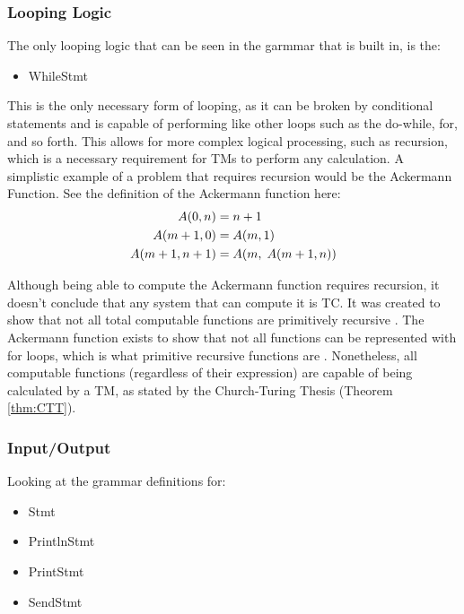 \subsubsection{Looping Logic}\label{subsubsec:LoopLog}

The only looping logic that can be seen in the garmmar that is built in, is the:
\begin{itemize}
    \item WhileStmt
\end{itemize}

This is the only necessary form of looping, as it can be broken by conditional statements and is capable of performing like other loops such as the do-while, for, and so forth.
This allows for more complex logical processing, such as recursion, which is a necessary requirement for TMs to perform any calculation.
A simplistic example of a problem that requires recursion would be the Ackermann Function.
See the definition of the Ackermann function here:
\[
\begin{aligned}
    A(0, n) &= n + 1\\
    A(m + 1, 0) &= A(m,1)\\
    A(m + 1, n + 1) &= A(m,\hspace{0.1cm} A(m + 1,n))
\end{aligned}
\]

Although being able to compute the Ackermann function requires recursion, it doesn't conclude that any system that can compute it is TC.
It was created to show that not all total computable functions are primitively recursive \cite{AckermannPR}.
The Ackermann function exists to show that not all functions can be represented with for loops, which is what primitive recursive functions are \cite{RecursiveFuncs}.
Nonetheless, all computable functions (regardless of their expression) are capable of being calculated by a TM, as stated by the Church-Turing Thesis (Theorem \ref{thm:CTT}).

\subsubsection{Input/Output}\label{subsubsec:IO}

Looking at the grammar definitions for:
\begin{itemize}
    \item Stmt
    \item PrintlnStmt
    \item PrintStmt
    \item SendStmt
\end{itemize}

